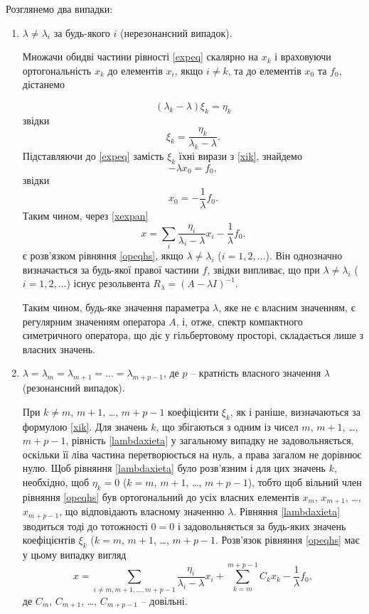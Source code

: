 \documentclass[14pt,twoside]{extreport}
\theoremstyle{mystyle}
\numberwithin{equation}{chapter}
\begin{document}
Розглянемо два випадки:
\begin{enumerate}
 \item $\lambda \neq \lambda_i$ за будь-якого $i$ (нерезонансний випадок).

Множачи обидві частини рівності \eqref{expeq} скалярно на $x_k$ і враховуючи ортогональність $x_k$ до елементів $x_i$, якщо $i\neq k$, та до елементів $x_0$ та $f_0$, дістанемо

\begin{equation}\label{lambdaxieta}
 (\lambda_k - \lambda) \xi_k = \eta_k
\end{equation}
звідки
\begin{equation}\label{xik}
 \xi_k = \dfrac{\eta_k}{\lambda_k - \lambda}.
\end{equation}
Підставляючи до \eqref{expeq} замість $\xi_k$ їхні вирази з \eqref{xik}, знайдемо
\[
 -\lambda x_0 = f_0,
\]
звідки
\[
 x_0 = -\dfrac{1}{\lambda} f_0.
\]
Таким чином, через \eqref{xexpan}
\begin{equation}\label{xregular}
 x= \sum_{i} \dfrac{\eta_i}{\lambda_i - \lambda} x_i - \dfrac{1}{\lambda} f_0.
\end{equation}
є розв'язком рівняння \eqref{opeqhs}, якщо $\lambda \neq \lambda_i$ ($i = 1, 2, \ldots$). Він однозначно визначається за будь-якої правої частини $f$, звідки випливає, що при $\lambda \neq \lambda_i$ ($i = 1, 2, \ldots$) існує резольвента $R_{\lambda} = (A - \lambda I)^{-1}$.

Таким чином, будь-яке значення параметра $\lambda$, яке не є власним значенням, є регулярним значенням оператора $A$, і, отже, спектр компактного симетричного оператора, що діє у гільбертовому просторі, складається лише з власних значень.

\item $\lambda = \lambda_m = \lambda_{m+1} = \ldots = \lambda_{m+p-1}$, де $p$ -- кратність власного значення $\lambda$ (резонансний випадок).

При $k \neq m$, $m+1$, \ldots, $m+p-1$ коефіцієнти $\xi_k$, як і раніше, визначаються за формулою \eqref{xik}. Для значень $k$, що збігаються з одним із чисел $m$, $m + 1$, \ldots, $m+p-1$, рівність \eqref{lambdaxieta} у загальному випадку не задовольняється, оскільки її ліва частина перетворюється на нуль, а права загалом не дорівнює нулю. Щоб рівняння \eqref{lambdaxieta} було розв'язним і для цих значень $k$, необхідно, щоб $\eta_k = 0$ ($k=m$, $m+1$, \ldots, $m+p-1$), тобто щоб вільний член рівняння \eqref{opeqhs} був ортогональний до усіх власних елементів $x_m$, $x_{m+1}$, \ldots, $x_{m+p-1}$, що відповідають власному значенню $\lambda$. Рівняння \eqref{lambdaxieta} зводиться тоді до тотожності $0 = 0$ і задовольняється за будь-яких значень коефіцієнтів $\xi_k$ ($k = m$, $m+1$, \ldots, $m+p-1$. Розв'язок рівняння \eqref{opeqhs} має у цьому випадку вигляд
\begin{equation}
 x= \sum_{i\neq m, m+1, \ldots, m+p-1} \dfrac{\eta_i}{\lambda_i - \lambda} x_i + \sum_{k=m}^{m+p-1} C_k x_k - \dfrac{1}{\lambda} f_0,
\end{equation}
де $C_m$, $C_{m+1}$, \ldots, $C_{m+p-1}$ -- довільні.
\end{enumerate}
\end{document}
